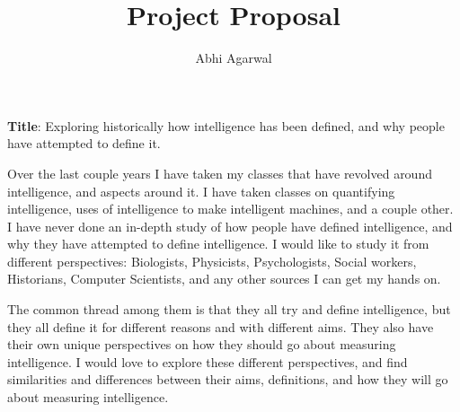 \documentclass[11pt, oneside]{article}
\title{Project Proposal\vspace{-0.4cm}}
\author{Abhi Agarwal\vspace{-1cm}}
\date{}
\begin{document}
\maketitle

\noindent \textbf{Title}: Exploring historically how intelligence has been defined, and why people have attempted to define it.

\par Over the last couple years I have taken my classes that have revolved around intelligence, and aspects around it. I have taken classes on quantifying intelligence, uses of intelligence to make intelligent machines, and a couple other. I have never done an in-depth study of how people have defined intelligence, and why they have attempted to define intelligence. I would like to study it from different perspectives: Biologists, Physicists, Psychologists, Social workers, Historians, Computer Scientists, and any other sources I can get my hands on.

\par The common thread among them is that they all try and define intelligence, but they all define it for different reasons and with different aims. They also have their own unique perspectives on how they should go about measuring intelligence. I would love to explore these different perspectives, and find similarities and differences between their aims, definitions, and how they will go about measuring intelligence. 
\end{document}
